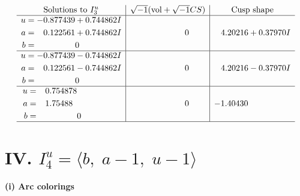 \documentclass[1p]{elsarticle_modified}
\theoremstyle{definition}
\newcommand{\I}{\sqrt{-1}}
\begin{document}
$$\begin{array}{c|c|c}  
\text{Solutions to }I^u_{3}& \I (\text{vol} + \sqrt{-1}CS) & \text{Cusp shape}\\
 \hline 
\begin{aligned}
u &= -0.877439 + 0.744862 I \\
a &= \phantom{-}0.122561 + 0.744862 I \\
b &= \phantom{-0.000000 } 0\end{aligned}
 & \phantom{-0.000000 } 0 & \phantom{-}4.20216 + 0.37970 I \\ \hline\begin{aligned}
u &= -0.877439 - 0.744862 I \\
a &= \phantom{-}0.122561 - 0.744862 I \\
b &= \phantom{-0.000000 } 0\end{aligned}
 & \phantom{-0.000000 } 0 & \phantom{-}4.20216 - 0.37970 I \\ \hline\begin{aligned}
u &= \phantom{-}0.754878\phantom{ +0.000000I} \\
a &= \phantom{-}1.75488\phantom{ +0.000000I} \\
b &= \phantom{-0.000000 } 0\end{aligned}
 & \phantom{-0.000000 } 0 & -1.40430\phantom{ +0.000000I}\\
 \hline 
 \end{array}$$\newpage\newpage\renewcommand{\arraystretch}{1}
\centering \section*{IV. $I^u_{4}= \langle b,\;a-1,\;u-1 \rangle$}
\flushleft \textbf{(i) Arc colorings}\\
\end{document}
